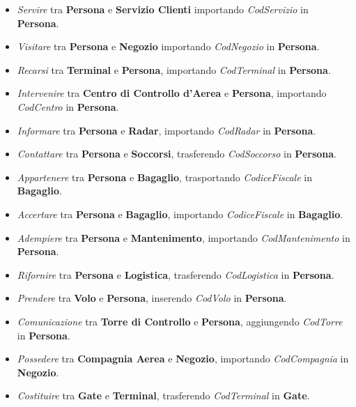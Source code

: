 \begin{itemize}
	\item \textsf{\small \emph{Servire} tra \textbf{Persona} e \textbf{Servizio Clienti} importando \emph{CodServizio} in \textbf{Persona}.}
	\item \textsf{\small \emph{Visitare} tra \textbf{Persona} e \textbf{Negozio} importando \emph{CodNegozio} in \textbf{Persona}.}
	\item \textsf{\small \emph{Recarsi} tra \textbf{Terminal} e \textbf{Persona}, importando \emph{CodTerminal} in \textbf{Persona}.}
	\item \textsf{\small \emph{Intervenire} tra \textbf{Centro di Controllo d'Aerea} e \textbf{Persona}, importando \emph{CodCentro} in \textbf{Persona}.}
	\item \textsf{\small \emph{Informare} tra \textbf{Persona} e \textbf{Radar}, importando \emph{CodRadar} in \textbf{Persona}.}
	\item \textsf{\small \emph{Contattare} tra \textbf{Persona} e \textbf{Soccorsi}, trasferendo \emph{CodSoccorso} in \textbf{Persona}.}
	\item \textsf{\small \emph{Appartenere} tra \textbf{Persona} e \textbf{Bagaglio}, trasportando \emph{CodiceFiscale} in \textbf{Bagaglio}.}
	\item \textsf{\small \emph{Accertare} tra \textbf{Persona} e \textbf{Bagaglio}, importando \emph{CodiceFiscale} in \textbf{Bagaglio}.}
	\item \textsf{\small \emph{Adempiere} tra \textbf{Persona} e \textbf{Mantenimento}, importando \emph{CodMantenimento} in \textbf{Persona}. }
	\item \textsf{\small \emph{Rifornire} tra \textbf{Persona} e \textbf{Logistica}, trasferendo \emph{CodLogistica} in \textbf{Persona}. }
	\item \textsf{\small \emph{Prendere} tra \textbf{Volo} e \textbf{Persona}, inserendo \emph{CodVolo} in \textbf{Persona}.}
	\item \textsf{\small \emph{Comunicazione} tra \textbf{Torre di Controllo} e \textbf{Persona}, aggiungendo \emph{CodTorre} in \textbf{Persona}.}
	\item \textsf{\small \emph{Possedere} tra \textbf{Compagnia Aerea} e \textbf{Negozio}, importando \emph{CodCompagnia} in \textbf{Negozio}.}
	\item \textsf{\small \emph{Costituire} tra \textbf{Gate} e \textbf{Terminal}, trasferendo \emph{CodTerminal} in \textbf{Gate}.}

\end{itemize}

